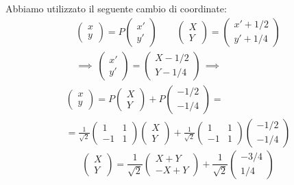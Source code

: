 
Abbiamo utilizzato il seguente cambio di coordinate: %
\begin{gather*}
    \begin{pmatrix}
        x\\y
    \end{pmatrix}=P\begin{pmatrix}
        x'\\y'
    \end{pmatrix}\qquad \begin{pmatrix}
        X\\Y
    \end{pmatrix}=\begin{pmatrix}
        x'+1/2\\ y'+1/4
    \end{pmatrix}\\
    \implies\:\begin{pmatrix}
        x'\\y'
    \end{pmatrix}=\begin{pmatrix}
        X-1/2\\ Y-1/4
    \end{pmatrix} \,\implies
\end{gather*}
\begin{multline*}
    \begin{pmatrix}
        x\\y
    \end{pmatrix}= P \begin{pmatrix}
        X\\Y
    \end{pmatrix}+ P\begin{pmatrix}
        -1/2\\ -1/4
    \end{pmatrix}=\\=\frac{1}{\sqrt{2}}\begin{pmatrix}
        1 & 1\\-1 & 1
    \end{pmatrix}\begin{pmatrix}
        X\\Y
    \end{pmatrix}+\frac{1}{\sqrt{2}}\begin{pmatrix}
        1 & 1\\-1 & 1
    \end{pmatrix}\begin{pmatrix}
        -1/2\\ -1/4
    \end{pmatrix}
\end{multline*}
\[
    \begin{pmatrix}
        X\\Y
    \end{pmatrix}=\frac{1}{\sqrt{2}}\begin{pmatrix}
        X+Y\\-X+Y
    \end{pmatrix}+\frac{1}{\sqrt{2}}\begin{pmatrix}
        -3/4\\ 1/4
    \end{pmatrix}
\]

